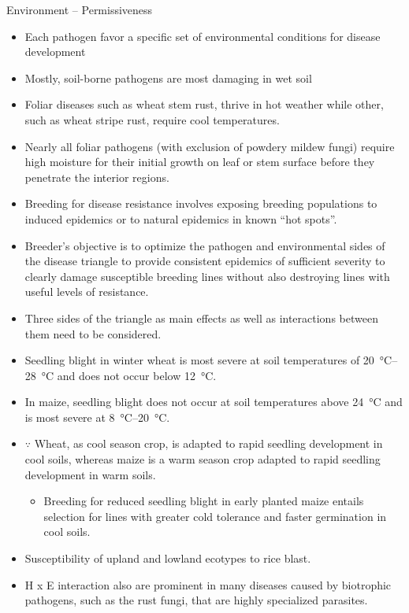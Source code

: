 \documentclass[11pt,dvipsnames,ignorenonframetext,aspectratio=169]{beamer}
\providecommand{\tightlist}{%
  \setlength{\itemsep}{0pt}\setlength{\parskip}{0pt}}
\begin{document}
\begin{frame}{Environment -- Permissiveness}
\protect\hypertarget{environment-permissiveness}{}
\small

\begin{itemize}
\tightlist
\item
  Each pathogen favor a specific set of environmental conditions for
  disease development
\item
  Mostly, soil-borne pathogens are most damaging in wet soil
\item
  Foliar diseases such as wheat stem rust, thrive in hot weather while
  other, such as wheat stripe rust, require cool temperatures.
\item
  Nearly all foliar pathogens (with exclusion of powdery mildew fungi)
  require high moisture for their initial growth on leaf or stem surface
  before they penetrate the interior regions.
\item
  Breeding for disease resistance involves exposing breeding populations
  to induced epidemics or to natural epidemics in known ``hot spots''.
\item
  Breeder's objective is to optimize the pathogen and environmental
  sides of the disease triangle to provide consistent epidemics of
  sufficient severity to clearly damage susceptible breeding lines
  without also destroying lines with useful levels of resistance.
\item
  Three sides of the triangle as main effects as well as interactions
  between them need to be considered.
\end{itemize}
\end{frame}

\begin{frame}{}
\protect\hypertarget{section-6}{}
\begin{itemize}
\tightlist
\item
  Seedling blight in winter wheat is most severe at soil temperatures of
  \SIrange{20}{28}{\celsius} and does not occur below \SI{12}{\celsius}.
\item
  In maize, seedling blight does not occur at soil temperatures above
  \SI{24}{\celsius} and is most severe at \SIrange{8}{20}{\celsius}.
\item
  \(\because\) Wheat, as cool season crop, is adapted to rapid seedling
  development in cool soils, whereas maize is a warm season crop adapted
  to rapid seedling development in warm soils.

  \begin{itemize}
  \tightlist
  \item
    Breeding for reduced seedling blight in early planted maize entails
    selection for lines with greater cold tolerance and faster
    germination in cool soils.
  \end{itemize}
\item
  Susceptibility of upland and lowland ecotypes to rice blast.
\item
  H x E interaction also are prominent in many diseases caused by
  biotrophic pathogens, such as the rust fungi, that are highly
  specialized parasites.
\end{itemize}
\end{frame}
\end{document}
